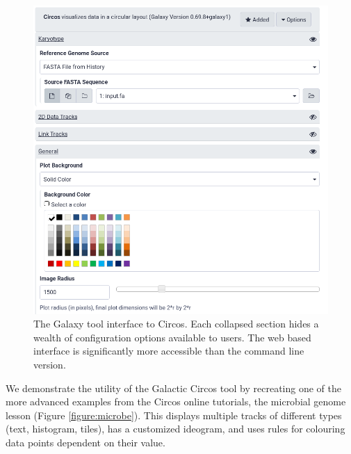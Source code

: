 \begin{figure}[h!]
\centering
\includegraphics[width=0.8\linewidth]{chapters/images/circos/circos-galaxy-ui.png}
\caption{The Galaxy tool interface to Circos. Each collapsed section hides a wealth of configuration options available to users. The web based interface is significantly more accessible than the command line version.}\label{figure:userinterface}
\end{figure}

We demonstrate the utility of the Galactic Circos tool by recreating one of the more advanced examples from the Circos online tutorials, the microbial genome lesson \cite{circos-microbial-example} (Figure \ref{figure:microbe}). This displays multiple tracks of different types (text, histogram, tiles), has a customized ideogram, and uses rules for colouring data points dependent on their value.

